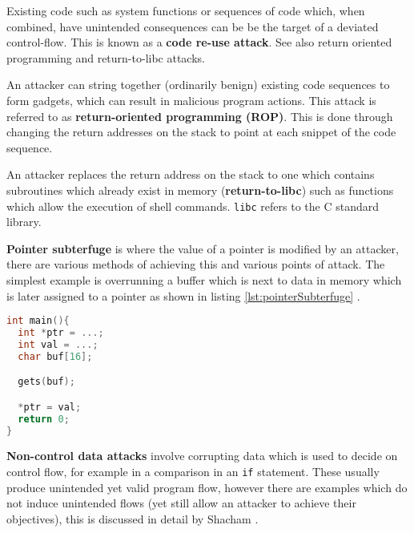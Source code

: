Existing code such as system functions or sequences of code which, when combined, have unintended consequences can be be the target of a deviated control-flow. This is known as a \textbf{code re-use attack}. See also return oriented programming and return-to-libc attacks.

An attacker can string together (ordinarily benign) existing code sequences to form gadgets, which can result in malicious program actions. This attack is referred to as \textbf{return-oriented programming (ROP)}. This is done through changing the return addresses on the stack to point at each snippet of the code sequence.

An attacker replaces the return address on the stack to one which contains subroutines which already exist in memory (\textbf{return-to-libc}) such as functions which allow the execution of shell commands. \verb|libc| refers to the C standard library.

\textbf{Pointer subterfuge} is where the value of a pointer is modified by an attacker, there are various methods of achieving this and various points of attack. The simplest example is overrunning a buffer which is next to data in memory which is later assigned to a pointer as shown in listing \ref{lst:pointerSubterfuge} \cite{Wang2016a}.

\begin{lstlisting}[language={C},caption={An example of code which is vulnerable to pointer subterfuge \cite{Wang2016a}},label={lst:pointerSubterfuge}]
int main(){
  int *ptr = ...;
  int val = ...;
  char buf[16];

  gets(buf);

  *ptr = val;
  return 0;
}
\end{lstlisting}


\textbf{Non-control data attacks} involve corrupting data which is used to decide on control flow, for example in a comparison in an \verb|if| statement. These usually produce unintended yet valid program flow, however there are examples which do not induce unintended flows (yet still allow an attacker to achieve their objectives), this is discussed in detail by Shacham \cite{Shacham2007}.